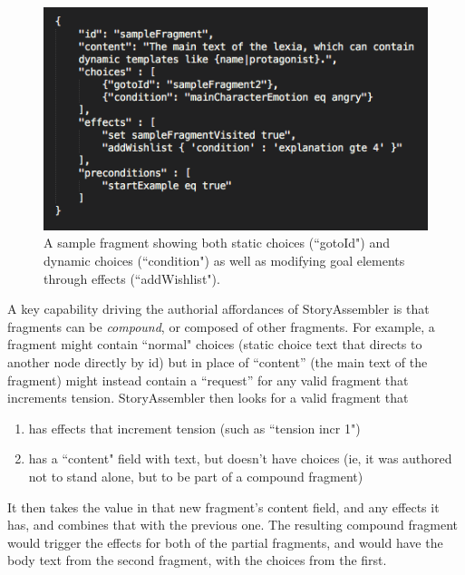 
\begin{figure}
    \centering
    \includegraphics[width=\textwidth]{figures/3-StoryAssembler/sample-fragment.png}
    \caption{A sample fragment showing both static choices (``gotoId") and dynamic choices (``condition") as well as modifying goal elements through effects (``addWishlist").}
    \label{fig:sample-fragment}
\end{figure}


A key capability driving the authorial affordances of StoryAssembler is that fragments can be \textit{compound}, or composed of other fragments. For example, a fragment might contain ``normal" choices (static choice text that directs to another node directly by id) but in place of ``content'' (the main text of the fragment) might instead contain a ``request'' for any valid fragment that increments tension. StoryAssembler then looks for a valid fragment that 

\begin{enumerate}
    \item has effects that increment tension (such as ``tension incr 1")
    \item has a ``content" field with text, but doesn't have choices (ie, it was authored not to stand alone, but to be part of a compound fragment)
\end{enumerate}


It then takes the value in that new fragment's content field, and any effects it has, and combines that with the previous one. The resulting compound fragment would trigger the effects for both of the partial fragments, and would have the body text from the second fragment, with the choices from the first.

